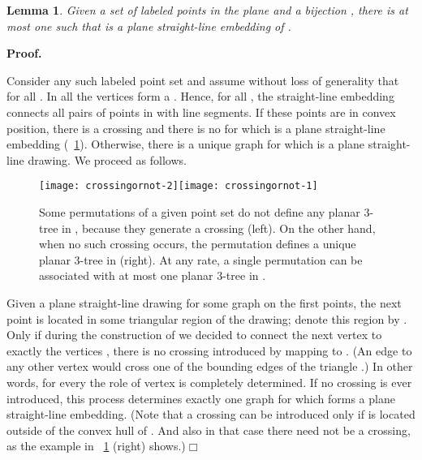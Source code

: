 \documentclass[11pt]{article}
\newtheorem{lemma}[equation]{Lemma}
\newcommand{\qed}{\hfill\ensuremath{\Box}}
\newenvironment{proof}{\noindent\textbf{Proof.}
}{\par\medskip}
\newcommand{\figscale}{1.1}
\begin{document}
\begin{lemma}
  \label{lem:labeled_points_unique_stacked}
  Given a set  of labeled points in the plane and a
  bijection , there is \emph{at most one}  such that
   is a plane straight-line embedding of .
\end{lemma}
\begin{proof}
  Consider any such labeled point set  and assume without loss of
  generality that  for all . In all  the
  vertices  form a . Hence, for all , the
  straight-line embedding  connects all pairs of points in
   with line segments. If these points are in
  convex position, there is a crossing and there is no  for
  which  is a plane straight-line embedding
  (\figurename~\ref{fig:crossingornot}). Otherwise, there is a unique
  graph  for which  is a plane
  straight-line drawing. We proceed as follows.

  \begin{figure}[htbp]
\hfil \texttt{[image: crossingornot-2]}\hfil \texttt{[image: crossingornot-1]}\hfil \caption{\label{fig:crossingornot}Some permutations of a given point set do
      not define any planar 3-tree in , because they generate a crossing
      (left). On the other hand, when no such crossing occurs, the permutation
      defines a unique planar 3-tree in  (right). At any rate, a single
      permutation can be associated with at most one planar 3-tree in .}
  \end{figure}

  Given a plane straight-line drawing for some graph  on the first
   points, the next point  is located in some triangular
  region of the drawing; denote this region by . Only if
  during the construction of  we decided to connect the next vertex  to
  exactly the vertices , there is no crossing introduced by
  mapping  to . (An edge to any other vertex would cross one of
  the bounding edges of the triangle .) In other words,
  for every  the role of vertex  is completely determined. If no
  crossing is ever introduced, this process determines exactly one graph
   for which  forms a plane straight-line embedding. (Note that
  a crossing can be introduced only if  is located outside of the
  convex hull of . And also in that case there need not be
  a crossing, as the example in \figurename~\ref{fig:crossingornot} (right)
  shows.)\qed
\end{proof}
\end{document}
